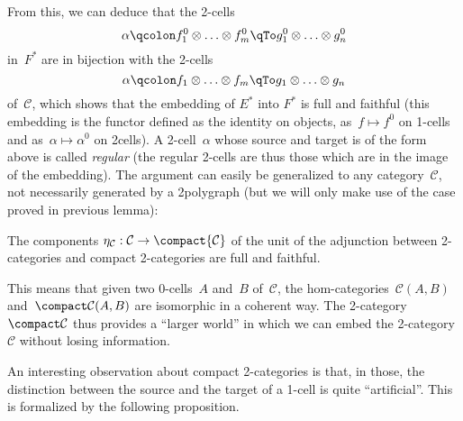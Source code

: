 \documentclass{LMCS}
\newenvironment{proposition}{\begin{prop}}{\end{prop}}
\renewcommand{\C}{\mathcal{C}}
\begin{document}
From this, we can deduce that the 2-cells
\[
\alpha
\qcolon
f_1^0\otimes\ldots\otimes f_m^0
\qTo
g_1^0\otimes\ldots\otimes g_n^0
\]
in~$F^*$ are in bijection with the 2-cells
\[
\alpha
\qcolon
f_1\otimes\ldots\otimes f_m
\qTo
g_1\otimes\ldots\otimes g_n
\]
of~$\C$, which shows that the embedding of $E^*$ into $F^*$ is full and faithful
(this embedding is the functor defined as the identity on objects, as~$f\mapsto
f^0$ on 1-cells and as~$\alpha\mapsto\alpha^0$ on 2\nbd{}cells). A
2-cell~$\alpha$ whose source and target is of the form above is called
\emph{regular} (the regular 2-cells are thus those which are in the image of the
embedding). The argument can easily be generalized to any category~$\C$, not
necessarily generated by a 2\nbd{}polygraph (but we will only make use of the
case proved in previous lemma):

\begin{proposition}
  \label{prop:compact-embedding}
  The components $\eta_\C:\C\to\compact{\C}$ of the unit of the adjunction
  between 2-categories and compact 2-categories are full and faithful.
\end{proposition}

\noindent
This means that given two 0-cells~$A$ and~$B$ of~$\C$, the
hom-categories~$\C(A,B)$ and~$\compact\C(A,B)$ are isomorphic in a coherent
way. The 2-category~$\compact\C$ thus provides a ``larger world'' in which we
can embed the 2-category~$\C$ without losing information.












An interesting observation about compact 2-categories is that, in those, the
distinction between the source and the target of a 1-cell is quite
``artificial''. This is formalized by the following proposition.
\end{document}
